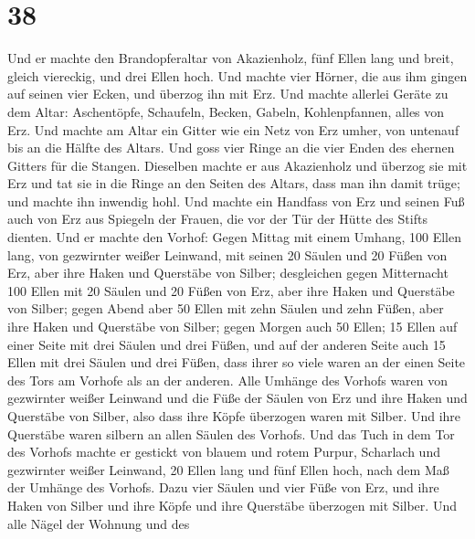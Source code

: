 \hypertarget{section-37}{%
\section{38}\label{section-37}}

 Und er machte den Brandopferaltar von Akazienholz, fünf
Ellen lang und breit, gleich viereckig, und drei Ellen hoch.
 Und machte vier Hörner, die aus ihm gingen auf seinen
vier Ecken, und überzog ihn mit Erz.  Und machte allerlei
Geräte zu dem Altar: Aschentöpfe, Schaufeln, Becken, Gabeln,
Kohlenpfannen, alles von Erz.  Und machte am Altar ein
Gitter wie ein Netz von Erz umher, von untenauf bis an die Hälfte des
Altars.  Und goss vier Ringe an die vier Enden des ehernen
Gitters für die Stangen.  Dieselben machte er aus
Akazienholz und überzog sie mit Erz  und tat sie in die
Ringe an den Seiten des Altars, dass man ihn damit trüge; und machte ihn
inwendig hohl.  Und machte ein Handfass von Erz und seinen
Fuß auch von Erz aus Spiegeln der Frauen, die vor der Tür der Hütte des
Stifts dienten.  Und er machte den Vorhof: Gegen Mittag
mit einem Umhang, 100 Ellen lang, von gezwirnter weißer Leinwand,
 mit seinen 20 Säulen und 20 Füßen von Erz, aber ihre
Haken und Querstäbe von Silber;  desgleichen gegen
Mitternacht 100 Ellen mit 20 Säulen und 20 Füßen von Erz, aber ihre
Haken und Querstäbe von Silber;  gegen Abend aber 50
Ellen mit zehn Säulen und zehn Füßen, aber ihre Haken und Querstäbe von
Silber;  gegen Morgen auch 50 Ellen;  15
Ellen auf einer Seite mit drei Säulen und drei Füßen, 
und auf der anderen Seite auch 15 Ellen mit drei Säulen und drei Füßen,
dass ihrer so viele waren an der einen Seite des Tors am Vorhofe als an
der anderen.  Alle Umhänge des Vorhofs waren von
gezwirnter weißer Leinwand  und die Füße der Säulen von
Erz und ihre Haken und Querstäbe von Silber, also dass ihre Köpfe
überzogen waren mit Silber. Und ihre Querstäbe waren silbern an allen
Säulen des Vorhofs.  Und das Tuch in dem Tor des Vorhofs
machte er gestickt von blauem und rotem Purpur, Scharlach und gezwirnter
weißer Leinwand, 20 Ellen lang und fünf Ellen hoch, nach dem Maß der
Umhänge des Vorhofs.  Dazu vier Säulen und vier Füße von
Erz, und ihre Haken von Silber und ihre Köpfe und ihre Querstäbe
überzogen mit Silber.  Und alle Nägel der Wohnung und des
